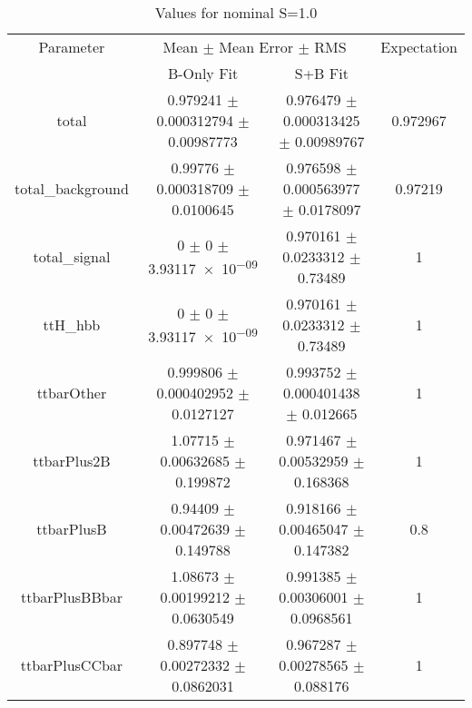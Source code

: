 \begin{table}
\centering
\caption{Values for nominal S=1.0}
\begin{tabular}{cccc}
\toprule
Parameter & \multicolumn{2}{c}{Mean $\pm$ Mean Error $\pm$ RMS} & Expectation\\
 & B-Only Fit & S+B Fit & \\
\midrule
total & \num{0.979241} $\pm$ \num{0.000312794} $\pm$ \num{0.00987773} & \num{0.976479} $\pm$ \num{0.000313425} $\pm$ \num{0.00989767} & \num{0.972967}\\
total\_background & \num{0.99776} $\pm$ \num{0.000318709} $\pm$ \num{0.0100645} & \num{0.976598} $\pm$ \num{0.000563977} $\pm$ \num{0.0178097} & \num{0.97219}\\
total\_signal & \num{0} $\pm$ \num{0} $\pm$ \num{3.93117e-09} & \num{0.970161} $\pm$ \num{0.0233312} $\pm$ \num{0.73489} & \num{1}\\
ttH\_hbb & \num{0} $\pm$ \num{0} $\pm$ \num{3.93117e-09} & \num{0.970161} $\pm$ \num{0.0233312} $\pm$ \num{0.73489} & \num{1}\\
ttbarOther & \num{0.999806} $\pm$ \num{0.000402952} $\pm$ \num{0.0127127} & \num{0.993752} $\pm$ \num{0.000401438} $\pm$ \num{0.012665} & \num{1}\\
ttbarPlus2B & \num{1.07715} $\pm$ \num{0.00632685} $\pm$ \num{0.199872} & \num{0.971467} $\pm$ \num{0.00532959} $\pm$ \num{0.168368} & \num{1}\\
ttbarPlusB & \num{0.94409} $\pm$ \num{0.00472639} $\pm$ \num{0.149788} & \num{0.918166} $\pm$ \num{0.00465047} $\pm$ \num{0.147382} & \num{0.8}\\
ttbarPlusBBbar & \num{1.08673} $\pm$ \num{0.00199212} $\pm$ \num{0.0630549} & \num{0.991385} $\pm$ \num{0.00306001} $\pm$ \num{0.0968561} & \num{1}\\
ttbarPlusCCbar & \num{0.897748} $\pm$ \num{0.00272332} $\pm$ \num{0.0862031} & \num{0.967287} $\pm$ \num{0.00278565} $\pm$ \num{0.088176} & \num{1}\\
\bottomrule
\end{tabular}
\end{table}